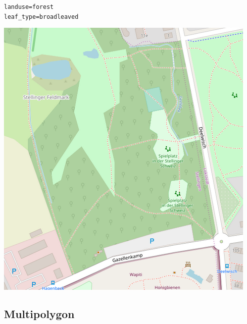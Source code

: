 \documentclass{beamer}
\begin{document}
\begin{frame}
\begin{center}
\begin{minipage}[b][0.6\textheight][c]{0.4\linewidth}
			\end{minipage}
			\begin{minipage}[b][0.6\textheight][c]{0.3\linewidth}
				\texttt{landuse=forest}\\
				\texttt{leaf\_type=broadleaved}
				\begin{center}
					\includegraphics[width=\linewidth,height=\textheight,keepaspectratio]{images/forest.png}
				\end{center}
			\end{minipage}
		\end{center}
	\end{frame}
				
	\subsection{Multipolygon}
	
\end{document}
